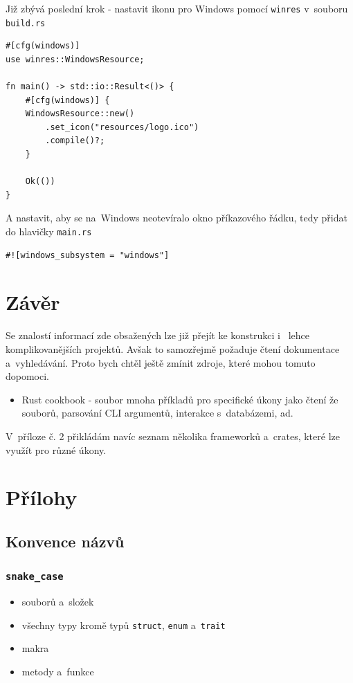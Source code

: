 \documentclass[a4paper, 12pt]{article} %
\newcommand{\rust}[1]{\texttt{#1}}
\begin{document}
        Již zbývá poslední krok - nastavit ikonu pro Windows pomocí \rust{winres} v~souboru \texttt{build.rs}
        \begin{verbatim}
#[cfg(windows)]
use winres::WindowsResource;

fn main() -> std::io::Result<()> {
    #[cfg(windows)] {
    WindowsResource::new()
        .set_icon("resources/logo.ico")
        .compile()?;
    }

    Ok(())
}
        \end{verbatim}
        
        A nastavit, aby se na~Windows neotevíralo okno příkazového řádku, tedy přidat do hlavičky \rust{main.rs}
        \begin{verbatim}
#![windows_subsystem = "windows"]
        \end{verbatim}


\section{Závěr}
    Se znalostí informací zde obsažených lze již přejít ke konstrukci i~ lehce komplikovanějších projektů. Avšak to samozřejmě požaduje čtení dokumentace a~vyhledávání. Proto bych chtěl ještě zmínit zdroje, které mohou tomuto dopomoci.
    \begin{itemize}
        \item Rust cookbook\cite{cookbook} - soubor mnoha příkladů pro specifické úkony jako čtení že souborů, parsování CLI argumentů, interakce s~databázemi, ad.
    \end{itemize}
    
    V~příloze č. 2 přikládám navíc seznam několika frameworků a~crates, které lze využít pro různé úkony.





\section{Přílohy}
    \subsection{Konvence názvů}
        \hypertarget{konvence_nazvu}{}


        \subsubsection*{\texttt{snake\_case}}
            \begin{itemize}
                \item souborů a~složek
                \item všechny typy kromě typů \texttt{struct}, \texttt{enum} a~\texttt{trait}
                \item makra
                \item metody a~funkce
            \end{itemize}
\end{document}
